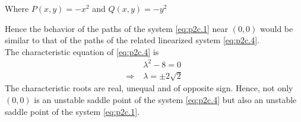 \documentclass[../main-sheet.tex]{subfiles}
\begin{document}
\begin{soln}[c]
\begin{enumerate}[label=(\roman*)]
        Where \(P(x,y)=-x^2\) and \(Q(x,y)=-y^2\)
    \end{enumerate}
    Hence the behavior of the paths of the system \eqref{eq:p2c.1} near \((0,0)\) would be similar to that of the paths of the related linearized system \eqref{eq:p2c.4}.\\
    The characteristic equation of \eqref{eq:p2c.4} is
    \begin{align*}
        &\lambda^2-8=0\\
        \Rightarrow\;&\lambda=\pm 2\sqrt{2}
    \end{align*}
    The characteristic roots are real, unequal and of opposite sign. Hence, not only \((0,0)\) is an unstable saddle point of the system \eqref{eq:p2c.4} but also an unstable saddle point of the system \eqref{eq:p2c.1}.\\
    

\end{soln}
\end{document}
